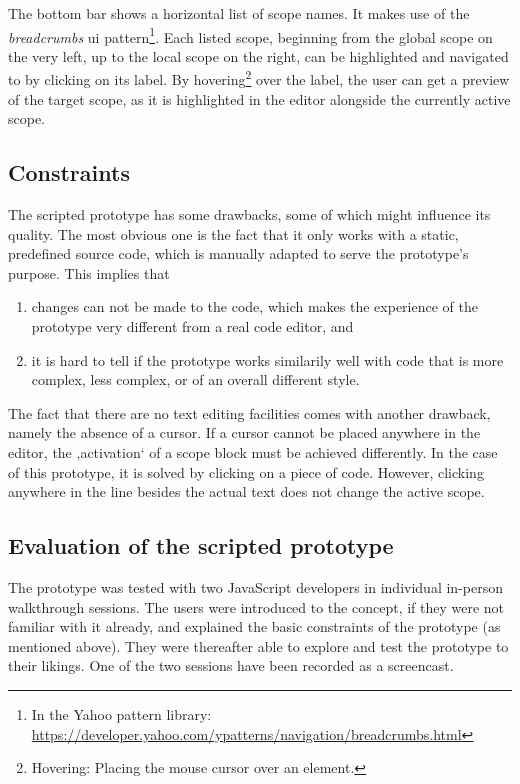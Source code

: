 The bottom bar shows a horizontal list of scope names. It makes use of
the \emph{breadcrumbs} \ac{ui}
pattern\footnote{In the Yahoo pattern library: \url{https://developer.yahoo.com/ypatterns/navigation/breadcrumbs.html}}.
Each listed scope, beginning from the global scope on the very left, up
to the local scope on the right, can be highlighted and navigated to by
clicking on its label. By
hovering\footnote{Hovering: Placing the mouse cursor over an element.}
over the label, the user can get a preview of the target scope, as it is
highlighted in the editor alongside the currently active scope.

\subsection{Constraints}\label{constraints}

The scripted prototype has some drawbacks, some of which might influence
its quality. The most obvious one is the fact that it only works with a
static, predefined source code, which is manually adapted to serve the
prototype’s purpose. This implies that

\begin{enumerate}
\def\labelenumi{\arabic{enumi}.}
\itemsep1pt\parskip0pt
\item
  changes can not be made to the code, which makes the experience of the
  prototype very different from a real code editor, and
\item
  it is hard to tell if the prototype works similarily well with code
  that is more complex, less complex, or of an overall different style.
\end{enumerate}

The fact that there are no text editing facilities comes with another
drawback, namely the absence of a cursor. If a cursor cannot be placed
anywhere in the editor, the ‚activation‘ of a scope block must be
achieved differently. In the case of this prototype, it is solved by
clicking on a piece of code. However, clicking anywhere in the line
besides the actual text does not change the active scope.

\subsection{Evaluation of the scripted
prototype}\label{evaluation-of-the-scripted-prototype}

The prototype was tested with two JavaScript developers in individual
in-person walkthrough sessions. The users were introduced to the
concept, if they were not familiar with it already, and explained the
basic constraints of the prototype (as mentioned above). They were
thereafter able to explore and test the prototype to their likings. One
of the two sessions have been recorded as a screencast.

